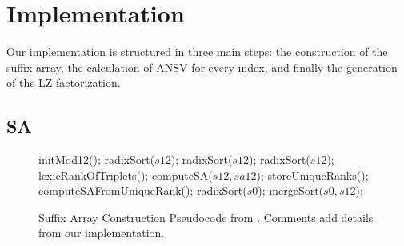 \chapter{Implementation}
\label{chap:implementation}

Our implementation is structured in three main steps: the construction of the suffix array, the calculation of ANSV for every index, and finally the generation of the LZ factorization.

\section{SA}

\begin{figure}[h]
\begin{algorithmic}[1]
\State initMod12();
\State radixSort($s12$);
\State radixSort($s12$); 
\State radixSort($s12$); 
\State lexicRankOfTriplets();
\State computeSA($s12,sa12$);
\State storeUniqueRanks();
\Else
\State computeSAFromUniqueRank();
\EndIf
\State radixSort($s0$); 
\State mergeSort($s0,s12$); 
\EndProcedure
\end{algorithmic}
\caption{Suffix Array Construction Pseudocode from \cite{Deo}. Comments add details from our implementation.}
\label{algorithm:sa}
\end{figure}

